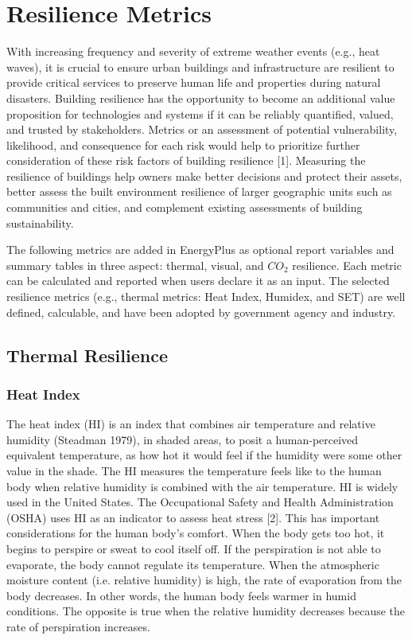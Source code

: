 \section{Resilience Metrics}\label{resilience-metrics}

With increasing frequency and severity of extreme weather events (e.g., heat
waves), it is crucial to ensure urban buildings and infrastructure are resilient
to provide critical services to preserve human life and properties during
natural disasters. Building resilience has the opportunity to become an
additional value proposition for technologies and systems if it can be reliably
quantified, valued, and trusted by stakeholders. Metrics or an assessment of
potential vulnerability, likelihood, and consequence for each risk would help to
prioritize further consideration of these risk factors of building resilience
[1]. Measuring the resilience of buildings help owners make better decisions and
protect their assets, better assess the built environment resilience of larger
geographic units such as communities and cities, and complement existing
assessments of building sustainability.

The following metrics are added in EnergyPlus as optional report variables and
summary tables in three aspect: thermal, visual, and $CO_{2}$ resilience. Each
metric can be calculated and reported when users declare it as an input. The
selected resilience metrics (e.g., thermal metrics: Heat Index, Humidex, and
SET) are well defined, calculable, and have been adopted by government agency
and industry.

\subsection{Thermal Resilience}\label{thermal-resilience}

\subsubsection{Heat Index}\label{heat-index}

The heat index (HI) is an index that combines air temperature and relative
humidity (Steadman 1979), in shaded areas, to posit a human-perceived equivalent
temperature, as how hot it would feel if the humidity were some other value in
the shade. The HI measures the temperature feels like to the human body when
relative humidity is combined with the air temperature. HI is widely used in the
United States. The Occupational Safety and Health Administration (OSHA) uses HI
as an indicator to assess heat stress [2]. This has important considerations for
the human body's comfort. When the body gets too hot, it begins to perspire or
sweat to cool itself off. If the perspiration is not able to evaporate, the body
cannot regulate its temperature. When the atmospheric moisture content (i.e.
relative humidity) is high, the rate of evaporation from the body decreases. In
other words, the human body feels warmer in humid conditions. The opposite is
true when the relative humidity decreases because the rate of perspiration
increases.

